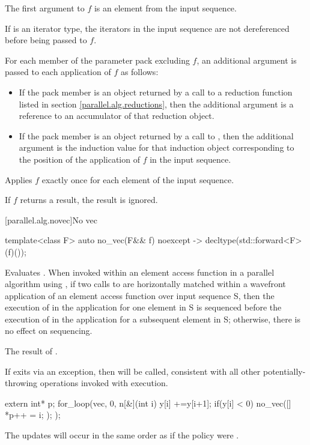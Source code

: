 \begin{itemdescr}
The first argument to $f$ is an element from the input sequence.\begin{note}If  is an iterator type, the iterators in the input sequence are not dereferenced before being passed to $f$.\end{note} For each member of the  parameter pack excluding $f$, an additional argument is passed to each application of $f$ as follows:

\begin{itemize}
\item If the pack member is an object returned by a call to a reduction function listed in section \ref{parallel.alg.reductions}, then the additional argument is a reference to an accumulator of that reduction object.

\item If the pack member is an object returned by a call to , then the additional argument is the induction value for that induction object corresponding to the position of the application of $f$ in the input sequence.
\end{itemize}

\pnum
\complexity Applies $f$ exactly once for each element of the input sequence.

\pnum
\remarks If $f$ returns a result, the result is ignored.

\end{itemdescr}

[parallel.alg.novec]{No vec}

\begin{itemdecl}
template<class F>
  auto no_vec(F&& f) noexcept -> decltype(std::forward<F>(f)());
\end{itemdecl}

\begin{itemdescr}
\pnum
\effects Evaluates . When invoked within an element access function in a parallel algorithm using , if two calls to  are horizontally matched within a wavefront application of an element access function over input sequence S, then the execution of  in the application for one element in S is sequenced before the execution of  in the application for a subsequent element in S; otherwise, there is no effect on sequencing.

\pnum
\returns The result of .

\pnum
\realnotes If  exits via an exception, then  will be called, consistent with all other potentially-throwing operations invoked with  execution.

\begin{example}
\begin{codeblock}
extern int* p;
for_loop(vec, 0, n[&](int i) {
  y[i] +=y[i+1];
  if(y[i] < 0) {
    no_vec([]{
      *p++ = i;
    });
  }
});
\end{codeblock}

The updates  will occur in the same order as if the policy were .
\end{example}

\end{itemdescr}

